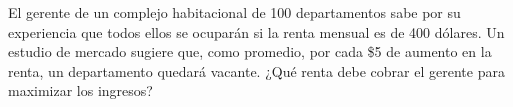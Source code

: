 \item El gerente de un complejo habitacional de 100 departamentos sabe por su experiencia que todos ellos se ocuparán si la renta mensual es de 400 dólares. Un estudio de mercado sugiere que, como promedio, por cada \$5 de aumento en la renta, un departamento quedará vacante. ¿Qué renta debe cobrar el gerente para maximizar los ingresos?
